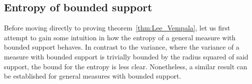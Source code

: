 
  


\subsection{Entropy of bounded support}

Before moving directly to proving theorem~\ref{thm:Lee_Vempala}, let us first attempt to gain some intuition 
in how the entropy of a general measure with bounded support behaves. In contrast to the variance, 
where the variance of a measure with bounded support is trivially bounded by the radius squared of 
said support, the bound for the entropy is less clear. Nonetheless, a similar result can be established 
for general measures with bounded support.


